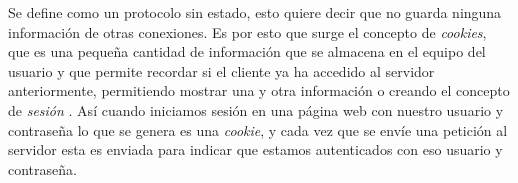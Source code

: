  Se define como un protocolo sin estado, esto quiere decir que no guarda ninguna información de otras conexiones. Es por esto que surge el concepto de \emph{cookies}\cite{cookie}, que es una pequeña cantidad de información que se almacena en el equipo del usuario y que permite recordar si el cliente ya ha accedido al servidor anteriormente, permitiendo mostrar una y otra información o creando el concepto de \emph{sesión} \cite{session}. Así cuando iniciamos sesión en una página web con nuestro usuario y contraseña lo que se genera es una \emph{cookie}, y cada vez que se envíe una petición al servidor esta es enviada para indicar que estamos autenticados con eso usuario y contraseña.


